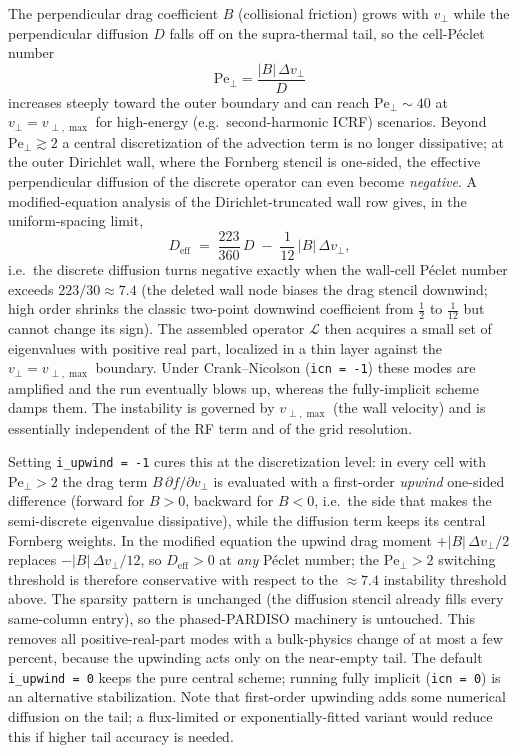 \documentclass[11pt,a4paper]{article}
\newcommand{\vp}{v_\perp}
\newcommand{\vpmax}{v_{\perp,\max}}
\newcommand{\Lcal}{\mathcal{L}}
\begin{document}
The perpendicular drag coefficient $B$ (collisional friction) grows with $\vp$
while the perpendicular diffusion $D$ falls off on the supra-thermal tail, so the
cell-P\'eclet number
\begin{equation}
  \mathrm{Pe}_\perp = \frac{|B|\,\Delta\vp}{D}
\end{equation}
increases steeply toward the outer boundary and can reach $\mathrm{Pe}_\perp \sim
40$ at $\vp = \vpmax$ for high-energy (e.g.\ second-harmonic ICRF) scenarios.
Beyond $\mathrm{Pe}_\perp \gtrsim 2$ a central discretization of the advection
term is no longer dissipative; at the outer Dirichlet wall, where the Fornberg
stencil is one-sided, the effective perpendicular diffusion of the discrete
operator can even become \emph{negative}.  A modified-equation analysis of the
Dirichlet-truncated wall row gives, in the uniform-spacing limit,
\begin{equation}
  D_{\mathrm{eff}} \;=\; \frac{223}{360}\,D \;-\; \frac{1}{12}\,|B|\,\Delta\vp ,
\end{equation}
i.e.\ the discrete diffusion turns negative exactly when the wall-cell P\'eclet
number exceeds $223/30 \approx 7.4$ (the deleted wall node biases the drag stencil
downwind; high order shrinks the classic two-point downwind coefficient from
$\tfrac12$ to $\tfrac{1}{12}$ but cannot change its sign).  The assembled operator $\Lcal$ then
acquires a small set of eigenvalues with positive real part, localized in a thin
layer against the $\vp = \vpmax$ boundary.  Under Crank--Nicolson
(\texttt{icn = -1}) these modes are amplified and the run eventually blows up,
whereas the fully-implicit scheme damps them.  The instability is governed by
$\vpmax$ (the wall velocity) and is essentially independent of the RF term and of
the grid resolution.

Setting \texttt{i\_upwind = -1} cures this at the discretization level: in every
cell with $\mathrm{Pe}_\perp > 2$ the drag term $B\,\partial f/\partial\vp$ is
evaluated with a first-order \emph{upwind} one-sided difference (forward for
$B>0$, backward for $B<0$, i.e.\ the side that makes the semi-discrete eigenvalue
dissipative), while the diffusion term keeps its central Fornberg weights.  In the
modified equation the upwind drag moment $+|B|\,\Delta\vp/2$ replaces
$-|B|\,\Delta\vp/12$, so $D_{\mathrm{eff}} > 0$ at \emph{any} P\'eclet number; the
$\mathrm{Pe}_\perp > 2$ switching threshold is therefore conservative with respect
to the $\approx 7.4$ instability threshold above.  The
sparsity pattern is unchanged (the diffusion stencil already fills every
same-column entry), so the phased-PARDISO machinery is untouched.  This removes
all positive-real-part modes with a bulk-physics change of at most a few percent,
because the upwinding acts only on the near-empty tail.  The default
\texttt{i\_upwind = 0} keeps the pure central scheme; running fully implicit
(\texttt{icn = 0}) is an alternative stabilization.  Note that first-order
upwinding adds some numerical diffusion on the tail; a flux-limited or
exponentially-fitted variant would reduce this if higher tail accuracy is needed.
\end{document}
